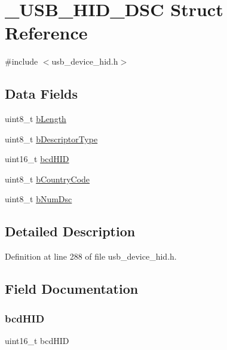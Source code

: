 \hypertarget{struct___u_s_b___h_i_d___d_s_c}{}\section{\+\_\+\+U\+S\+B\+\_\+\+H\+I\+D\+\_\+\+D\+SC Struct Reference}
\label{struct___u_s_b___h_i_d___d_s_c}


{\ttfamily \#include $<$usb\+\_\+device\+\_\+hid.\+h$>$}

\subsection*{Data Fields}
\begin{DoxyCompactItemize}
\item 
uint8\+\_\+t \mbox{\hyperlink{struct___u_s_b___h_i_d___d_s_c_a1deca1f1d6e5815b290e6e1015bce5b8}{b\+Length}}
\item 
uint8\+\_\+t \mbox{\hyperlink{struct___u_s_b___h_i_d___d_s_c_a67d7027b9eb9ed268d28e84fbc675707}{b\+Descriptor\+Type}}
\item 
uint16\+\_\+t \mbox{\hyperlink{struct___u_s_b___h_i_d___d_s_c_acf09c753851ce018b81a07325bda9d8e}{bcd\+H\+ID}}
\item 
uint8\+\_\+t \mbox{\hyperlink{struct___u_s_b___h_i_d___d_s_c_a969a604033b72573d59a740badf6920e}{b\+Country\+Code}}
\item 
uint8\+\_\+t \mbox{\hyperlink{struct___u_s_b___h_i_d___d_s_c_a7f4967d648617041435cda2e6078df25}{b\+Num\+Dsc}}
\end{DoxyCompactItemize}


\subsection{Detailed Description}


Definition at line 288 of file usb\+\_\+device\+\_\+hid.\+h.



\subsection{Field Documentation}
\mbox{\label{struct___u_s_b___h_i_d___d_s_c_acf09c753851ce018b81a07325bda9d8e}} 
\subsubsection{\texorpdfstring{bcdHID}{bcdHID}}
{\footnotesize\ttfamily uint16\+\_\+t bcd\+H\+ID}



